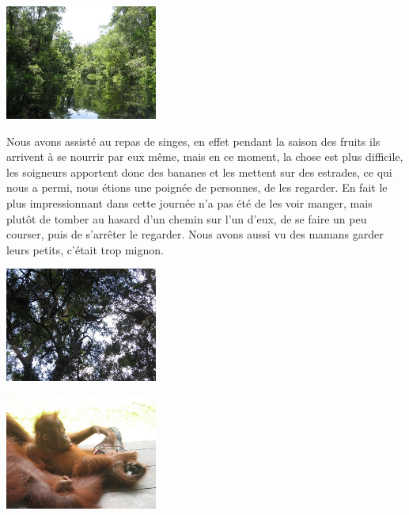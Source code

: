 \begin{multicols}{2}
\smallbreak
\hspace*{-0.65cm}
\includegraphics[width=5cm]{articles/Borneo/1210332087kPql.jpg}
\smallbreak

Nous avons assisté au repas de singes, en effet pendant la saison des fruits ils arrivent à se nourrir par eux même, mais en ce moment, la chose est plus difficile, les soigneurs apportent donc des bananes et les mettent sur des estrades, ce qui nous a permi, nous étions une poignée de personnes, de les regarder. En fait le plus impressionnant dans cette journée n'a pas été de les voir manger, mais plutôt de tomber au hasard d'un chemin sur l'un d'eux, de se faire un peu courser, puis de s'arrêter le regarder. Nous avons aussi vu des mamans garder leurs petits, c'était trop mignon.

\smallbreak
\hspace*{-0.65cm}
\includegraphics[width=5cm]{articles/Borneo/1210332096AngR.jpg}
\smallbreak

\smallbreak
\hspace*{-0.65cm}
\includegraphics[width=5cm]{articles/Borneo/1210332100Imld.jpg}
\smallbreak


\end{multicols}


